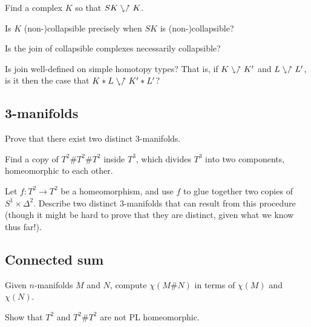 \documentclass[12pt]{pset}
\newcommand{\she}{\ssearrow\nnearrow}
\newcommand{\join}{\ast}
\begin{document}
\begin{requiredproblem}
  Find a complex $K$ so that $SK \she K$.
\end{requiredproblem}

\begin{problem}
  Is $K$ (non-)collapsible precisely when $SK$ is (non-)collapsible?
\end{problem}

\begin{problem}
 Is the join of collapsible complexes necessarily collapsible?
\end{problem}

\begin{problem}
  Is join well-defined on simple homotopy types?  That is, if $K \she
  K'$ and $L \she L'$, is it then the case that $K \join L \she K'
  \join L'$?
\end{problem}

\subsection*{3-manifolds}

\begin{problem}
  Prove that there exist two distinct 3-manifolds.
\end{problem}

\begin{problem}
  Find a copy of $T^2 \# T^2 \# T^2$ inside $T^3$, which divides $T^3$
  into two components, homeomorphic to each other.
\end{problem}

\begin{problem}
 Let $f : T^2 \to T^2$ be a homeomorphism, and use $f$ to glue
 together two copies of $S^1 \times \Delta^2$.  Describe 
 two distinct $3$-manifolds that can result from this procedure
 (though it might be hard to prove that they are distinct, given what
 we know thus far!).
\end{problem}


\subsection*{Connected sum}

\begin{problem}
  Given $n$-manifolds $M$ and $N$, compute $\chi(M \# N)$ in terms of
  $\chi(M)$ and $\chi(N)$.
\end{problem}

\begin{requiredproblem}
Show that $T^2$ and $T^2 \# T^2$ are not PL homeomorphic.
\end{requiredproblem}
\end{document}
